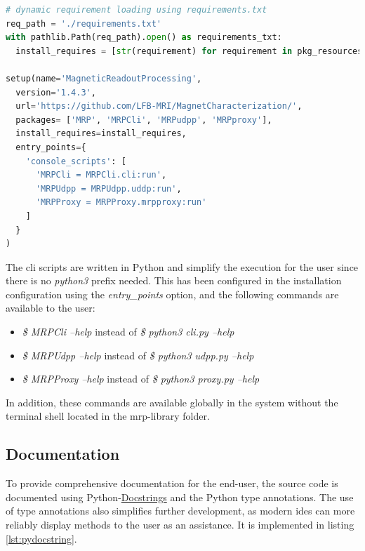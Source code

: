 \newpage

\begin{lstlisting}[language=Python, caption={setup.py with dynamic requirement parsing using a given requirements.txt}, label=lst:setup_py_req]
# dynamic requirement loading using requirements.txt
req_path = './requirements.txt'
with pathlib.Path(req_path).open() as requirements_txt:
  install_requires = [str(requirement) for requirement in pkg_resources.parse_requirements(requirements_txt)]

setup(name='MagneticReadoutProcessing',
  version='1.4.3',
  url='https://github.com/LFB-MRI/MagnetCharacterization/',
  packages= ['MRP', 'MRPCli', 'MRPudpp', 'MRPproxy'],
  install_requires=install_requires,
  entry_points={
    'console_scripts': [
      'MRPCli = MRPCli.cli:run',
      'MRPUdpp = MRPUdpp.uddp:run',
      'MRPProxy = MRPProxy.mrpproxy:run'
    ]
  }
)
\end{lstlisting}

The \gls{cli} scripts are written in Python and simplify the execution
for the user since there is no \emph{python3} prefix needed. This has
been configured in the installation configuration using the
\emph{entry\_points} option, and the following commands are available to
the user:

\begin{itemize}
\tightlist
\item
  \emph{\$ MRPCli --help} instead of \emph{\$ python3 cli.py --help}
\item
  \emph{\$ MRPUdpp --help} instead of \emph{\$ python3 udpp.py --help}
\item
  \emph{\$ MRPProxy --help} instead of \emph{\$ python3 proxy.py --help}
\end{itemize}

In addition, these commands are available globally in the system without
the terminal shell located in the \gls{mrp}-library folder.

\hypertarget{documentation}{%
\subsection{Documentation}\label{documentation}}

To provide comprehensive documentation for the end-user, the source code
is documented using
Python-\href{https://peps.python.org/pep-0257/}{Docstrings} and the
Python type annotations. The use of type annotations also simplifies
further development, as modern \gls{ide}s can more reliably display
methods to the user as an assistance. It is implemented in listing
\ref{lst:pydocstring}.

